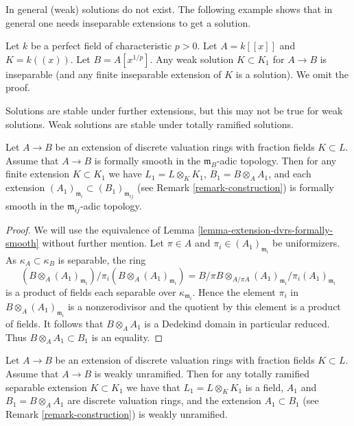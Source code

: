\noindent
In general (weak) solutions do not exist. The following example shows that
in general one needs inseparable extensions to get a solution.

\begin{example}
\label{example-inseparable-necessary}
Let $k$ be a perfect field of characteristic $p > 0$. Let $A = k[[x]]$
and $K = k((x))$. Let $B = A[x^{1/p}]$. Any weak solution $K \subset K_1$
for $A \to B$ is inseparable (and any finite inseparable extension of
$K$ is a solution). We omit the proof.
\end{example}

\noindent
Solutions are stable under further extensions, but this may not be true for
weak solutions. Weak solutions are stable under totally ramified solutions.

\begin{lemma}
\label{lemma-formally-smooth-goes-up}
Let $A \to B$ be an extension of discrete valuation rings with fraction fields
$K \subset L$. Assume that $A \to B$ is formally smooth in the
$\mathfrak m_B$-adic topology. Then for any finite extension $K \subset K_1$
we have $L_1 = L \otimes_K K_1$, $B_1 = B \otimes_A A_1$, and each extension
$(A_1)_{\mathfrak m_i} \subset (B_1)_{\mathfrak m_{ij}}$ (see
Remark \ref{remark-construction}) is formally smooth in the
$\mathfrak m_{ij}$-adic topology.
\end{lemma}

\begin{proof}
We will use the equivalence of Lemma \ref{lemma-extension-dvrs-formally-smooth}
without further mention. Let $\pi \in A$ and $\pi_i \in (A_1)_{\mathfrak m_i}$
be uniformizers. As $\kappa_A \subset \kappa_B$ is separable, the ring
$$
(B \otimes_A (A_1)_{\mathfrak m_i})/\pi_i (B \otimes_A (A_1)_{\mathfrak m_i}) =
B/\pi B \otimes_{A/\pi A} (A_1)_{\mathfrak m_i}/\pi_i (A_1)_{\mathfrak m_i}
$$
is a product of fields each separable over $\kappa_{\mathfrak m_i}$.
Hence the element $\pi_i$ in $B \otimes_A (A_1)_{\mathfrak m_i}$
is a nonzerodivisor and the quotient by this element is a product of fields.
It follows that $B \otimes_A A_1$ is a Dedekind domain in particular
reduced. Thus $B \otimes_A A_1 \subset B_1$ is an equality.
\end{proof}

\begin{lemma}
\label{lemma-weakly-unramified-goes-up-along-totally-ramified}
Let $A \to B$ be an extension of discrete valuation rings with fraction
fields $K \subset L$. Assume that $A \to B$ is weakly unramified. Then for
any totally ramified separable extension $K \subset K_1$
we have that $L_1 = L \otimes_K K_1$ is a field, $A_1$ and
$B_1 = B \otimes_A A_1$ are discrete valuation rings, and the extension
$A_1 \subset B_1$ (see
Remark \ref{remark-construction}) is weakly unramified.
\end{lemma}

